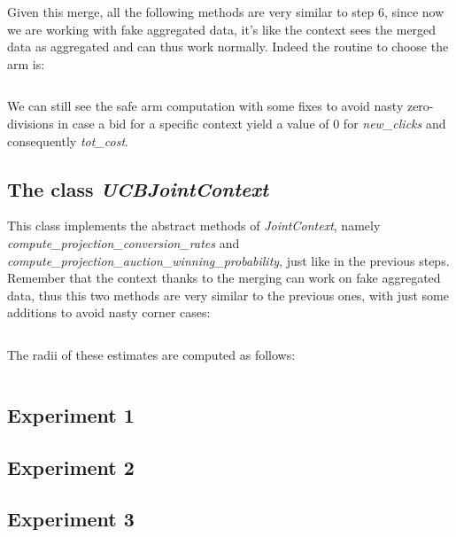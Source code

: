 \documentclass[11pt]{article} %
\begin{document}
Given this merge, all the following methods are very similar to step 6, since now we are working with fake aggregated data,
it's like the context sees the merged data as aggregated and can thus work normally.
Indeed the routine to choose the arm is:
\inputminted{python}{code/step7_context_arm_choice.py}
We can still see the safe arm computation with some fixes to avoid nasty zero-divisions in case a bid for a specific context
yield a value of 0 for \textit{new\_clicks} and consequently \textit{tot\_cost}.

\subsection{The class \textit{UCBJointContext}}
This class implements the abstract methods of \textit{JointContext}, namely \\ \textit{compute\_projection\_conversion\_rates}
and \textit{compute\_projection\_auction\_winning\_probability}, just like in the previous steps. Remember that the context
thanks to the merging can work on fake aggregated data, thus this two methods are very similar to the previous ones, with
just some additions to avoid nasty corner cases:
\inputminted{python}{code/step7_computation_random_variables.py}
The radii of these estimates are computed as follows:
\inputminted{python}{code/step7_radii_computation.py}

\clearpage
\subsection{Experiment 1}

\clearpage
{\footnotesize}

\clearpage
\subsection{Experiment 2}

\clearpage
{\footnotesize}

\clearpage
\subsection{Experiment 3}
\end{document}

